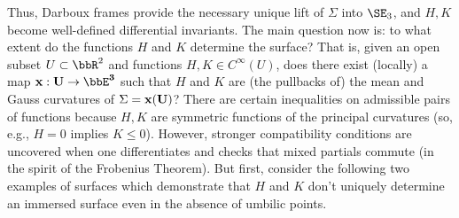Thus, Darboux frames provide the necessary unique lift of $\Sigma$ into $\SE_3$, and $H,K$ become well-defined differential invariants. The main question now is: to what extent do the functions $H$ and $K$ determine the surface? That is, given an open subset $U\subset\bbR^2$ and functions $H,K\in C^\infty(U)$, does there exist (locally) a map $\bf{x}:U\to \bbE^3$ such that $H$ and $K$ are (the pullbacks of) the mean and Gauss curvatures of $\Sigma=\bf{x}(U)$? There are certain inequalities on admissible pairs of functions because $H,K$ are symmetric functions of the principal curvatures (so, e.g., $H=0$ implies $K\leq 0$). However, stronger compatibility conditions are uncovered when one differentiates and checks that mixed partials commute (in the spirit of the Frobenius Theorem). But first, consider the following two examples of surfaces which demonstrate that $H$ and $K$ don't uniquely determine an immersed surface even in the absence of umbilic points.

